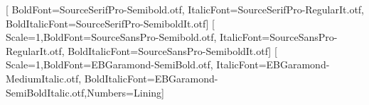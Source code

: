 \usepackage{fancyhdr,titlesec,caption,graphicx}
\usepackage{ragged2e}
\setmainfont{SourceSerifPro-Regular.otf}[
  BoldFont=SourceSerifPro-Semibold.otf, ItalicFont=SourceSerifPro-RegularIt.otf,
  BoldItalicFont=SourceSerifPro-SemiboldIt.otf]
\setsansfont{SourceSansPro-Regular.otf}[
  Scale=1,BoldFont=SourceSansPro-Semibold.otf, ItalicFont=SourceSansPro-RegularIt.otf,
  BoldItalicFont=SourceSansPro-SemiboldIt.otf]
\newfontfamily{}[
  Scale=1,BoldFont=EBGaramond-SemiBold.otf, ItalicFont=EBGaramond-MediumItalic.otf,
  BoldItalicFont=EBGaramond-SemiBoldItalic.otf,Numbers=Lining]
\newcommand{\FolioSpaceSmall}{6pt}
\newcommand{\FolioSpaceBlock}{12pt}
\newcommand{\FolioSpaceSection}{18pt}
\newcommand{\FolioSubtitle}{}
\providecommand{\subtitle}[1]{\renewcommand{\FolioSubtitle}{#1}}
\newcommand{\FolioLabel}[1]{{\sffamily\bfseries\fontsize{8.5}{11}\selectfont #1}}
\newcommand{\FolioTitleSpacing}{%
  \parfillskip=0pt\spaceskip=\fontdimen2\font\hyphenpenalty=10000\relax}
\newcommand{\FolioTitleCentered}{%
  \centering\leftskip=0pt plus .5\linewidth\rightskip=\leftskip\FolioTitleSpacing}
\newcommand{\FolioTitleRaggedRight}{%
  \raggedright\rightskip=0pt plus 1\linewidth\FolioTitleSpacing}
\makeatletter
\renewcommand{\@makefntext}[1]{%
  \parindent=0pt\noindent\hangindent=1.2em\hangafter=1%
  \makebox[1.2em][l]{\@makefnmark}#1}
\newcommand{\FolioByline}{%
  {\sffamily\fontsize{9.5}{12}\selectfont\color{FolioMuted}\def\and{, }%
   \@author\ifx\@date\@empty\else\ifx\@author\@empty\else\enspace·\enspace\fi\@date\fi\par}}
\newcommand{\FolioDate}{\@date}
\newcommand{\FolioAuthor}{\begingroup\def\and{, }\@author\endgroup}
\newcommand{\FolioCredit}{\ifx\@author\@empty\else
  {\sffamily\fontsize{10}{13}\selectfont\color{FolioInk}\FolioAuthor\par}\fi}
\newcommand{\FolioTitle}{\@title}
\makeatother
\pagestyle{fancy}\fancyhf{}
\renewcommand{\headrulewidth}{0pt}
\renewcommand{\footrulewidth}{0pt}
\fancyfoot[L]{\sffamily\footnotesize\color{FolioMuted}\FolioKind}
\fancyfoot[R]{\sffamily\footnotesize\color{FolioInk}\thepage}
\setlength{\parindent}{0pt}
\AtBeginDocument{%
  \setlength{\headwidth}{\textwidth}%
  \color{FolioInk}\setlength{\parskip}{7pt plus 1.5pt minus 1pt}}
